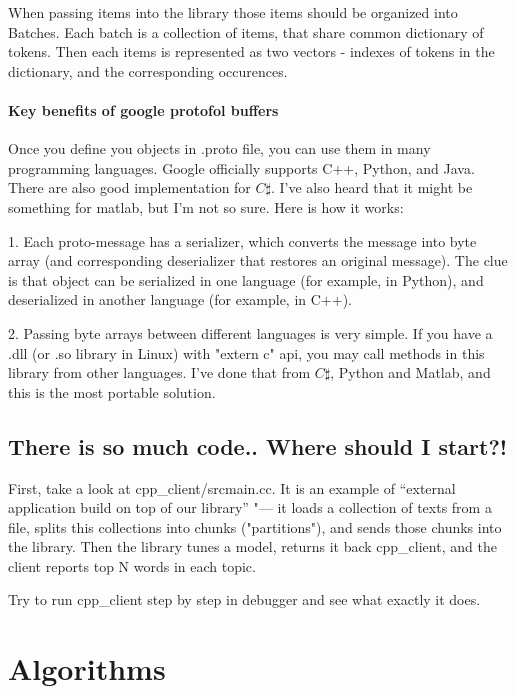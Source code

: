 \documentclass[11pt,a4paper,twoside]{report}
\begin{document}
When passing items into the library those items should be organized into Batches.
Each batch is a collection of items, that share common dictionary of tokens.
Then each items is represented as two vectors - indexes of tokens in the dictionary,
and the corresponding occurences.

\paragraph{Key benefits of google protofol buffers}

Once you define you objects in .proto file, you can use them in many programming languages.
Google officially supports C++, Python, and Java. There are also good implementation for $C\sharp$.
I've also heard that it might be something for matlab, but I'm not so sure. Here is how it works:

1. Each proto-message has a serializer, which converts the message into byte array
(and corresponding deserializer that restores an original message).
The clue is that object can be serialized in one language (for example, in Python),
and deserialized in another language (for example, in C++).

2. Passing byte arrays between different languages is very simple.
If you have a .dll (or .so library in Linux) with "extern c" api,
you may call methods in this library from other languages.
I've done that from $C\sharp$, Python and Matlab,
and this is the most portable solution.

\subsection{There is so much code.. Where should I start?!}

First, take a look at cpp\_client/srcmain.cc.
It is an example of ``external application build on top of our library'' "---
it loads a collection of texts from a file,
splits this collections into chunks ("partitions"),
and sends those chunks into the library.
Then the library tunes a model,
returns it back  cpp\_client,
and the client reports top N words in each topic.

Try to run cpp\_client step by step in debugger and see what exactly it does.

\section{Algorithms}
\end{document}
